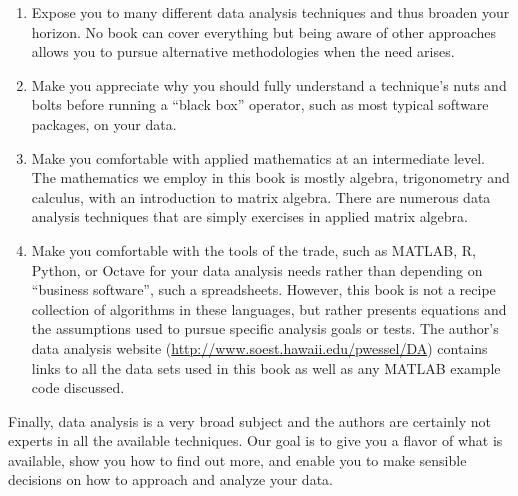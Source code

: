 \begin{enumerate}
\item Expose you to many different data analysis techniques and thus broaden your horizon. No book can cover
   everything but being aware of other approaches allows you to pursue alternative
methodologies when the need arises.
\item Make you appreciate why you should fully understand a technique's nuts and bolts before running a ``black
   box'' operator, such as most typical software packages, on your data.
\item Make you comfortable with applied mathematics at an intermediate level.  The mathematics we employ
   in this book is mostly algebra, trigonometry and calculus, with an introduction to matrix algebra.
   There are numerous data analysis techniques that are simply exercises in applied matrix algebra.
\item Make you comfortable with the tools of the trade, such as MATLAB, R, Python, or Octave for your data analysis needs
   rather than depending on ``business software'', such a spreadsheets.
   However, this book is not a recipe collection of algorithms in these languages, but rather presents equations and the
   assumptions used to pursue specific analysis goals or tests.  The author's data analysis website
   (\url{http://www.soest.hawaii.edu/pwessel/DA}) contains links to all the
   data sets used in this book as well as any MATLAB example code discussed.
\end{enumerate}

Finally, data analysis is a very broad subject and the authors are certainly not experts in all the available
techniques. Our goal is to give you a flavor
of what is available, show you how to find out more, and enable you to make sensible decisions on how
to approach and analyze your data.

